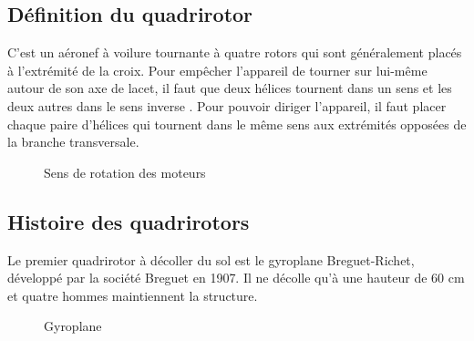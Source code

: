 \subsection{Définition du quadrirotor}
C'est un aéronef à voilure tournante à quatre rotors qui sont généralement placés à l'extrémité de la croix. Pour empêcher l'appareil de tourner sur lui-même autour de son axe de lacet, il faut que deux hélices tournent dans un sens et les deux autres dans le sens inverse \cite{Wikipidea}. Pour pouvoir diriger l'appareil, il faut placer chaque paire d'hélices qui tournent dans le même sens aux extrémités opposées de la branche transversale.
\begin{figure}[H] 
\begin{center} 
	\centering
\end{center}
\caption{Sens de rotation des moteurs }
\end{figure}
\subsection{Histoire des quadrirotors}
Le premier quadrirotor à décoller du sol est le gyroplane Breguet-Richet, développé par la société Breguet en 1907. Il ne décolle qu'à une hauteur de 60 cm et quatre hommes maintiennent la structure\cite{Wikipidea}. 
\begin{figure}[H] 
\begin{center} 
	\centering
	
\end{center}
\caption{Gyroplane }
\end{figure}

